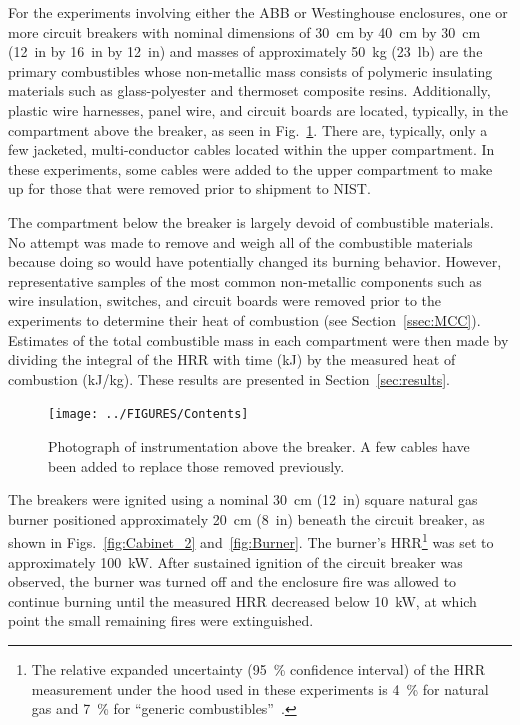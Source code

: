 For the experiments involving either the ABB or Westinghouse enclosures, one or more circuit breakers with nominal dimensions of 30~cm by 40~cm by 30~cm (12~in by 16~in by 12~in) and masses of approximately 50~kg (23~lb) are the primary combustibles whose non-metallic mass consists of polymeric insulating materials such as glass-polyester and thermoset composite resins. Additionally, plastic wire harnesses, panel wire, and circuit boards are located, typically, in the compartment above the breaker, as seen in Fig.~\ref{fig:Contents}. There are, typically, only a few jacketed, multi-conductor cables located within the upper compartment. In these experiments, some cables were added to the upper compartment to make up for those that were removed prior to shipment to NIST.

The compartment below the breaker is largely devoid of combustible materials. No attempt was made to remove and weigh all of the combustible materials because doing so would have potentially changed its burning behavior. However, representative samples of the most common non-metallic components such as wire insulation, switches, and circuit boards were removed prior to the experiments to determine their heat of combustion (see Section~\ref{ssec:MCC}). Estimates of the total combustible mass in each compartment were then made by dividing the integral of the HRR with time (kJ) by the measured heat of combustion (kJ/kg). These results are presented in Section~\ref{sec:results}.

\begin{figure}[t]
\centering
\texttt{[image: ../FIGURES/Contents]}
\caption[Photograph of instrumentation above the breaker] {Photograph of instrumentation above the breaker. A few cables have been added to replace those removed previously.}
\label{fig:Contents}
\end{figure}

The breakers were ignited using a nominal 30~cm (12~in) square natural gas burner positioned approximately 20~cm (8~in) beneath the circuit breaker, as shown in Figs.~\ref{fig:Cabinet_2} and~\ref{fig:Burner}. The burner's HRR\footnote{The relative expanded uncertainty (95~\% confidence interval) of the HRR measurement under the hood used in these experiments is 4~\% for natural gas and 7~\% for ``generic combustibles''~\cite{bryant2019nist}.} was set to approximately 100~kW. After sustained ignition of the circuit breaker was observed, the burner was turned off and the enclosure fire was allowed to continue burning until the measured HRR decreased below 10~kW, at which point the small remaining fires were extinguished.

